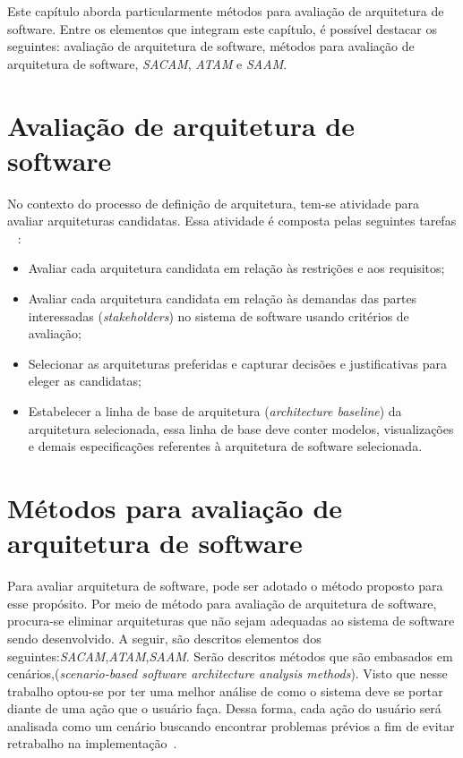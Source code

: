 Este capítulo aborda particularmente métodos para avaliação de arquitetura de software. Entre os elementos que integram este capítulo, é possível destacar os seguintes: avaliação de arquitetura de software, métodos para avaliação de arquitetura de software, \emph{\acrfull{SACAM}}, \emph{\acrfull{ATAM}} e \emph{\acrfull{SAAM}}.

\section{Avaliação de arquitetura de software}

No contexto do processo de definição de arquitetura, tem-se atividade para avaliar arquiteturas candidatas. Essa atividade é composta pelas seguintes tarefas ~\cite{ISO_12207} :
\begin{itemize}
    \item Avaliar cada arquitetura candidata em relação às restrições e aos requisitos;
    \item Avaliar cada arquitetura candidata em relação às demandas das partes interessadas (\emph{stakeholders}) no sistema de software usando critérios de avaliação;
    \item Selecionar as arquiteturas preferidas e capturar decisões e justificativas para eleger as candidatas;
    \item Estabelecer a linha de base de arquitetura (\emph{architecture baseline}) da arquitetura selecionada, essa linha de base deve conter modelos, visualizações e demais especificações referentes à arquitetura de software selecionada.
\end{itemize}

\section{Métodos para avaliação de arquitetura de software}

Para avaliar arquitetura de software, pode ser adotado o método proposto para esse propósito. Por meio de método para avaliação de arquitetura de software, procura-se eliminar arquiteturas que não sejam adequadas ao sistema de software sendo desenvolvido. A seguir, são descritos elementos dos seguintes:\emph{\acrfull{SACAM}},\emph{\acrfull{ATAM}},\emph{\acrfull{SAAM}}. Serão descritos métodos que são embasados em cenários,(\emph{scenario-based software architecture analysis methods}). Visto que nesse trabalho optou-se por ter uma melhor análise de como o sistema deve se portar diante de uma ação que o usuário faça. Dessa forma, cada ação do usuário será analisada como um cenário buscando encontrar problemas prévios a fim de evitar retrabalho na implementação~\cite{survey_methods}. 
  
